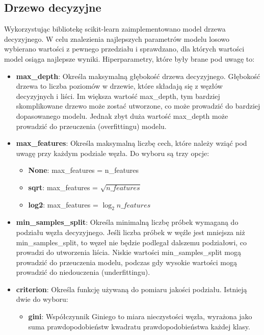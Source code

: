 \documentclass{article}
\begin{document}
\subsection{Drzewo decyzyjne}

Wykorzystując bibliotekę scikit-learn zaimplementowano model drzewa
decyzyjnego. W celu znalezienia najlepszych parametrów modelu losowo
wybierano wartości z pewnego przedziału i sprawdzano, dla których wartości
model osiąga najlepsze wyniki. Hiperparametry, które były brane pod uwagę to:

\begin{itemize}
    \item \textbf{max\_depth}: Określa maksymalną 
    głębokość drzewa decyzyjnego. 
    Głębokość drzewa to liczba poziomów w 
    drzewie, które składają się z węzłów 
    decyzyjnych i liści. Im większa wartość 
    max\_depth, tym bardziej skomplikowane 
    drzewo może zostać utworzone, co może 
    prowadzić do bardziej dopasowanego modelu. 
    Jednak zbyt duża wartość max\_depth może 
    prowadzić do przeuczenia (overfittingu) modelu.
    \item \textbf{max\_features}: Określa maksymalną
    liczbę cech, które należy wziąć pod uwagę
    przy każdym podziale węzła. Do wyboru są trzy opcje:
    \begin{itemize}
        \item \textbf{None}: max\_features = n\_features
        \item \textbf{sqrt}: max\_features = $\sqrt{n\_features}$
        \item \textbf{log2}: max\_features = $\log_2{n\_features}$
    \end{itemize}
    \item \textbf{min\_samples\_split}: Określa minimalną 
    liczbę próbek wymaganą do podziału węzła decyzyjnego. 
    Jeśli liczba próbek w węźle jest mniejsza niż 
    min\_samples\_split, to węzeł nie będzie podlegał 
    dalszemu podziałowi, co prowadzi do utworzenia 
    liścia. Niskie wartości min\_samples\_split mogą 
    prowadzić do przeuczenia modelu, podczas gdy 
    wysokie wartości mogą prowadzić do niedouczenia (underfittingu).
    \item \textbf{criterion}: Określa funkcję używaną 
    do pomiaru jakości podziału. Istnieją dwie do wyboru:
    \begin{itemize}
        \item \textbf{gini}: Współczynnik Giniego to miara
        nieczystości węzła, wyrażona jako suma prawdopodobieństw
        kwadratu prawdopodobieństwa każdej klasy.

\end{itemize}
\end{itemize}
\end{document}
